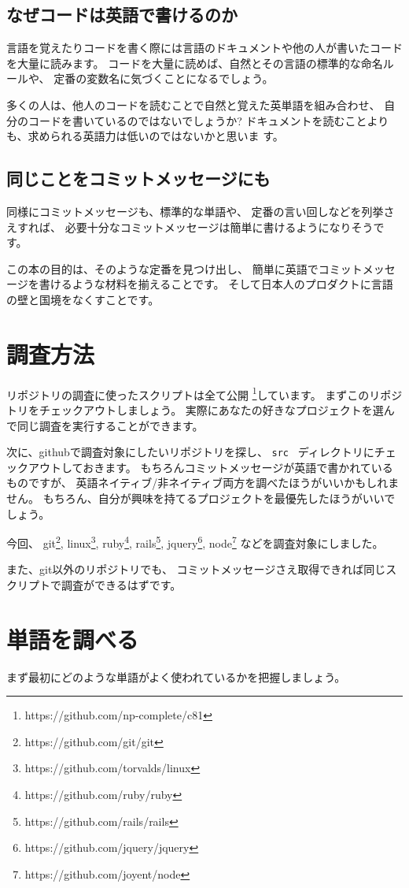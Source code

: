 \documentclass{jarticle}
\begin{document}
\subsection{なぜコードは英語で書けるのか}
言語を覚えたりコードを書く際には言語のドキュメントや他の人が書いたコード
を大量に読みます。
コードを大量に読めば、自然とその言語の標準的な命名ルールや、
定番の変数名に気づくことになるでしょう。

多くの人は、他人のコードを読むことで自然と覚えた英単語を組み合わせ、
自分のコードを書いているのではないでしょうか?
ドキュメントを読むことよりも、求められる英語力は低いのではないかと思いま
す。
\subsection{同じことをコミットメッセージにも}
同様にコミットメッセージも、標準的な単語や、
定番の言い回しなどを列挙さえすれば、
必要十分なコミットメッセージは簡単に書けるようになりそうです。

この本の目的は、そのような定番を見つけ出し、
簡単に英語でコミットメッセージを書けるような材料を揃えることです。
そして日本人のプロダクトに言語の壁と国境をなくすことです。

\newpage
\section{調査方法}
リポジトリの調査に使ったスクリプトは全て公開
\footnote{https://github.com/np-complete/c81}しています。
まずこのリポジトリをチェックアウトしましょう。
実際にあなたの好きなプロジェクトを選んで同じ調査を実行することができます。

次に、githubで調査対象にしたいリポジトリを探し、
{\tt src } ディレクトリにチェックアウトしておきます。
もちろんコミットメッセージが英語で書かれているものですが、
英語ネイティブ/非ネイティブ両方を調べたほうがいいかもしれません。
もちろん、自分が興味を持てるプロジェクトを最優先したほうがいいでしょう。

今回、
git\footnote{https://github.com/git/git},
linux\footnote{https://github.com/torvalds/linux},
ruby\footnote{https://github.com/ruby/ruby},
rails\footnote{https://github.com/rails/rails},
jquery\footnote{https://github.com/jquery/jquery},
node\footnote{https://github.com/joyent/node}
などを調査対象にしました。

また、git以外のリポジトリでも、
コミットメッセージさえ取得できれば同じスクリプトで調査ができるはずです。

\section{単語を調べる}
まず最初にどのような単語がよく使われているかを把握しましょう。
\end{document}
